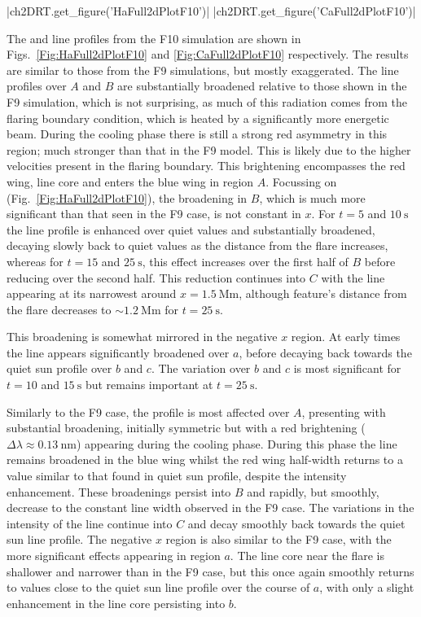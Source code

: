 \py[2DRT]|ch2DRT.get_figure('HaFull2dPlotF10')|
\py[2DRT]|ch2DRT.get_figure('CaFull2dPlotF10')|

The \Ha{} and \CaLine{} line profiles from the F10 simulation are shown in Figs.~\ref{Fig:HaFull2dPlotF10} and \ref{Fig:CaFull2dPlotF10} respectively.
The results are similar to those from the F9 simulations, but mostly exaggerated.
The line profiles over $A$ and $B$ are substantially broadened relative to those shown in the F9 simulation, which is not surprising, as much of this radiation comes from the flaring boundary condition, which is heated by a significantly more energetic beam.
During the cooling phase there is still a strong red asymmetry in this region; much stronger than that in the F9 model.
This is likely due to the higher velocities present in the flaring boundary.
This brightening encompasses the red wing, line core and enters the blue wing in region $A$.
Focussing on \Ha{} (Fig.~\ref{Fig:HaFull2dPlotF10}), the broadening in $B$, which is much more significant than that seen in the F9 case, is not constant in $x$.
For $t=5$ and $\SI{10}{\second}$ the line profile is enhanced over quiet values and substantially broadened, decaying slowly back to quiet values as the distance from the flare increases, whereas for $t=15$ and $\SI{25}{\second}$, this effect increases over the first half of $B$ before reducing over the second half.
This reduction continues into $C$ with the line appearing at its narrowest around $x=\SI{1.5}{\mega\metre}$, although feature's distance from the flare decreases to $\sim\SI{1.2}{\mega\metre}$ for $t=\SI{25}{\second}$.

This broadening is somewhat mirrored in the negative $x$ region.
At early times the line appears significantly broadened over $a$, before decaying back towards the quiet sun profile over $b$ and $c$.
The variation over $b$ and $c$ is most significant for $t=10$ and $\SI{15}{\second}$ but remains important at $t=\SI{25}{\second}$.

Similarly to the F9 case, the \CaLine{} profile is most affected over $A$, presenting with substantial broadening, initially symmetric but with a red brightening ($\Delta\lambda\approx\SI{0.13}{\nano\metre}$) appearing during the cooling phase.
During this phase the line remains broadened in the blue wing whilst the red wing half-width returns to a value similar to that found in quiet sun profile, despite the intensity enhancement.
These broadenings persist into $B$ and rapidly, but smoothly, decrease to the constant line width observed in the F9 case.
The variations in the intensity of the line continue into $C$ and decay smoothly back towards the quiet sun line profile.
The negative $x$ region is also similar to the F9 case, with the more significant effects appearing in region $a$.
The line core near the flare is shallower and narrower than in the F9 case, but this once again smoothly returns to values close to the quiet sun line profile over the course of $a$, with only a slight enhancement in the line core persisting into $b$.

